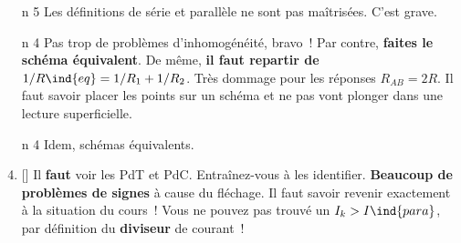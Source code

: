 \documentclass[a4paper, 11pt, final, garamond]{book}
\begin{document}
\begin{enumerate}[label=\sqenumi]
	\item[n]{5}%
	      Les définitions de série et parallèle ne sont pas maîtrisées. C'est
	      grave.
	\item[n]{4}%
	      Pas trop de problèmes d'inhomogénéité, bravo~! Par contre,
	      \textbf{faites le schéma équivalent}. De même, \textbf{il faut repartir
		      de $1/R\ind{eq} = 1/R_1 + 1/R_2$}.
	      \smallbreak
	      Très dommage pour les réponses $R_{AB} = 2R$. Il faut savoir placer
	      les points sur un schéma et ne pas vont plonger dans une lecture
	      superficielle.
	      \begin{center}
	      \end{center}
	\item[n]{4}%
	      Idem, schémas équivalents.
	\item{}[] %
	      Il \textbf{faut} voir les PdT et PdC. Entraînez-vous à les identifier.
	      \textbf{Beaucoup de problèmes de signes} à cause du fléchage. Il faut
	      savoir
	      revenir exactement à la situation du cours~!
	      \smallbreak
	      Vous ne pouvez pas trouvé un $I_k > I\ind{para}$, par définition du
	      \textbf{diviseur} de courant~!
\end{enumerate}

\setcounter{section}{0}
\end{document}
